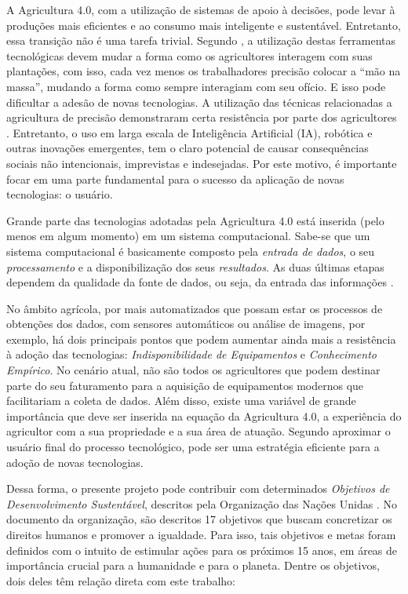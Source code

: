 \documentclass[12pt]{article}
\begin{document}
A Agricultura 4.0, com a utilização de sistemas de apoio à decisões, pode levar à produções mais eficientes e ao consumo mais inteligente e sustentável. Entretanto, essa transição não é uma tarefa trivial. Segundo , a utilização destas ferramentas tecnológicas devem mudar a forma como os agricultores interagem com suas plantações, com isso, cada vez menos os trabalhadores precisão colocar a ``mão na massa'', mudando a forma como sempre interagiam com seu ofício. E isso pode dificultar a adesão de novas tecnologias. A utilização das técnicas relacionadas a agricultura de precisão demonstraram certa resistência por parte dos agricultores \cite{Rose:2019}. Entretanto, o uso em larga escala de Inteligência Artificial (IA), robótica e outras inovações emergentes, tem o claro potencial de causar consequências sociais não intencionais, imprevistas e indesejadas. Por este motivo, é importante focar em uma parte fundamental para o sucesso da aplicação de novas tecnologias: o usuário.

Grande parte das tecnologias adotadas pela Agricultura 4.0 está inserida (pelo menos em algum momento) em um sistema computacional. Sabe-se que um sistema computacional é basicamente composto pela \textit{entrada de dados}, o seu \textit{processamento} e a disponibilização dos seus \textit{resultados}. As duas últimas etapas dependem da qualidade da fonte de dados, ou seja, da entrada das informações \cite{Torres:2013}.

No âmbito agrícola, por mais automatizados que possam estar os processos de obtenções dos dados, com sensores automáticos ou análise de imagens, por exemplo, há dois principais pontos que podem aumentar ainda mais a resistência à adoção das tecnologias: \textit{Indisponibilidade de Equipamentos} e \textit{Conhecimento Empírico}. No cenário atual, não são todos os agricultores que podem destinar parte do seu faturamento para a aquisição de equipamentos modernos que facilitariam a coleta de dados. Além disso, existe uma variável de grande importância que deve ser inserida na equação da Agricultura 4.0, a experiência do agricultor com a sua propriedade e a sua área de atuação. Segundo  aproximar o usuário final do processo tecnológico, pode ser uma estratégia eficiente para a adoção de novas tecnologias.

Dessa forma, o presente projeto pode contribuir com determinados \textit{Objetivos de Desenvolvimento Sustentável}, descritos pela Organização das Nações Unidas \cite{ONU:2020}. No documento da organização, são descritos 17 objetivos que buscam concretizar os direitos humanos e promover a igualdade. Para isso, tais objetivos e metas foram definidos com o intuito de estimular ações para os próximos 15 anos, em áreas de importância crucial para a humanidade e para o planeta. Dentre os objetivos, dois deles têm relação direta com este trabalho:
\end{document}

